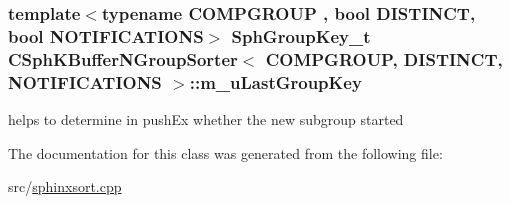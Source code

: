 \hypertarget{classCSphKBufferNGroupSorter_a52ac5cccf8a5688f84bfa048a322dc0e}{
\subsubsection[{m\-\_\-u\-Last\-Group\-Key}]{\setlength{\rightskip}{0pt plus 5cm}template$<$typename C\-O\-M\-P\-G\-R\-O\-U\-P , bool D\-I\-S\-T\-I\-N\-C\-T, bool N\-O\-T\-I\-F\-I\-C\-A\-T\-I\-O\-N\-S$>$ {\bf Sph\-Group\-Key\-\_\-t} {\bf C\-Sph\-K\-Buffer\-N\-Group\-Sorter}$<$ C\-O\-M\-P\-G\-R\-O\-U\-P, D\-I\-S\-T\-I\-N\-C\-T, N\-O\-T\-I\-F\-I\-C\-A\-T\-I\-O\-N\-S $>$\-::m\-\_\-u\-Last\-Group\-Key\hspace{0.3cm}{\ttfamily [protected]}}}\label{classCSphKBufferNGroupSorter_a52ac5cccf8a5688f84bfa048a322dc0e}


helps to determine in push\-Ex whether the new subgroup started 



The documentation for this class was generated from the following file\-:\begin{DoxyCompactItemize}
\item 
src/\hyperlink{sphinxsort_8cpp}{sphinxsort.\-cpp}\end{DoxyCompactItemize}
